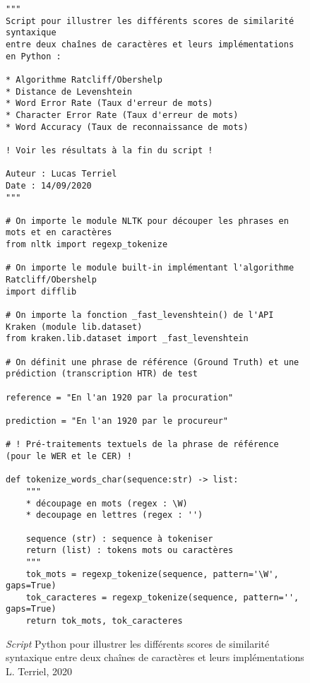 \begin{figure}[h]
    \caption{\textit{Script} Python pour illustrer les différents scores de similarité syntaxique entre deux chaînes de caractères et leurs implémentations \textcopyright L. Terriel, 2020}
    \label{fig:script_calc}
\lstset{language=Python}
\begin{lstlisting}
"""
Script pour illustrer les différents scores de similarité syntaxique
entre deux chaînes de caractères et leurs implémentations en Python :

* Algorithme Ratcliff/Obershelp
* Distance de Levenshtein
* Word Error Rate (Taux d'erreur de mots)
* Character Error Rate (Taux d'erreur de mots)
* Word Accuracy (Taux de reconnaissance de mots)

! Voir les résultats à la fin du script !

Auteur : Lucas Terriel
Date : 14/09/2020
"""

# On importe le module NLTK pour découper les phrases en mots et en caractères
from nltk import regexp_tokenize

# On importe le module built-in implémentant l'algorithme Ratcliff/Obershelp
import difflib

# On importe la fonction _fast_levenshtein() de l'API Kraken (module lib.dataset)
from kraken.lib.dataset import _fast_levenshtein

# On définit une phrase de référence (Ground Truth) et une prédiction (transcription HTR) de test

reference = "En l'an 1920 par la procuration"

prediction = "En l'an 1920 par le procureur"

# ! Pré-traitements textuels de la phrase de référence (pour le WER et le CER) !

def tokenize_words_char(sequence:str) -> list:
	"""
	* découpage en mots (regex : \W)
	* decoupage en lettres (regex : '')

	sequence (str) : sequence à tokeniser
	return (list) : tokens mots ou caractères
	"""
	tok_mots = regexp_tokenize(sequence, pattern='\W', gaps=True)
	tok_caracteres = regexp_tokenize(sequence, pattern='', gaps=True)
	return tok_mots, tok_caracteres
\end{lstlisting}
\end{figure}
